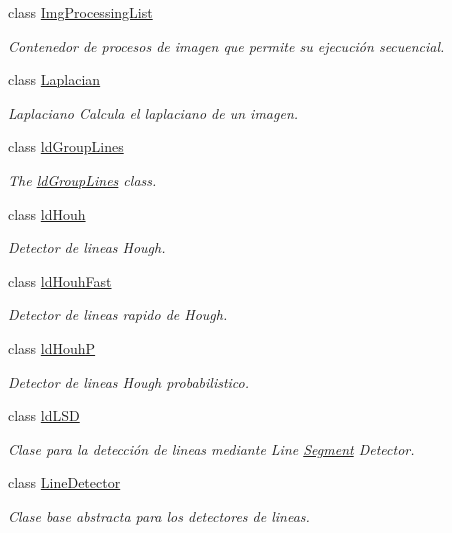 \begin{DoxyCompactItemize}
class \hyperlink{class_i3_d_1_1_img_processing_list}{Img\+Processing\+List}
\begin{DoxyCompactList}\small\item\em Contenedor de procesos de imagen que permite su ejecución secuencial. \end{DoxyCompactList}\item 
class \hyperlink{class_i3_d_1_1_laplacian}{Laplacian}
\begin{DoxyCompactList}\small\item\em Laplaciano Calcula el laplaciano de un imagen. \end{DoxyCompactList}\item 
class \hyperlink{class_i3_d_1_1ld_group_lines}{ld\+Group\+Lines}
\begin{DoxyCompactList}\small\item\em The \hyperlink{class_i3_d_1_1ld_group_lines}{ld\+Group\+Lines} class. \end{DoxyCompactList}\item 
class \hyperlink{class_i3_d_1_1ld_houh}{ld\+Houh}
\begin{DoxyCompactList}\small\item\em Detector de lineas Hough. \end{DoxyCompactList}\item 
class \hyperlink{class_i3_d_1_1ld_houh_fast}{ld\+Houh\+Fast}
\begin{DoxyCompactList}\small\item\em Detector de lineas rapido de Hough. \end{DoxyCompactList}\item 
class \hyperlink{class_i3_d_1_1ld_houh_p}{ld\+HouhP}
\begin{DoxyCompactList}\small\item\em Detector de lineas Hough probabilistico. \end{DoxyCompactList}\item 
class \hyperlink{class_i3_d_1_1ld_l_s_d}{ld\+L\+SD}
\begin{DoxyCompactList}\small\item\em Clase para la detección de lineas mediante Line \hyperlink{class_i3_d_1_1_segment}{Segment} Detector. \end{DoxyCompactList}\item 
class \hyperlink{class_i3_d_1_1_line_detector}{Line\+Detector}
\begin{DoxyCompactList}\small\item\em Clase base abstracta para los detectores de lineas. \end{DoxyCompactList}\item 

\end{DoxyCompactItemize}
